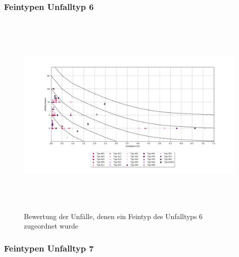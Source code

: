 \subsubsection{Feintypen Unfalltyp 6}


\begin{savenotes}
	\begin{figure}[H]
		\centering
		\includegraphics[width=18cm,height=10cm]{figures/Bewertung_FT6}
		\caption[Bewertung der Unfälle, denen ein Feintyp des Unfalltyps 6 zugeordnet wurde]{Bewertung der Unfälle, denen ein Feintyp des Unfalltyps 6 zugeordnet wurde}\label{fig:Bewertung_FT6}
	\end{figure}
\end{savenotes}

\subsubsection{Feintypen Unfalltyp 7}


